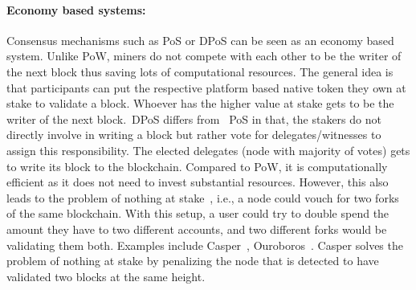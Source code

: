 \paragraph{Economy based systems:}Consensus mechanisms such as \ac{PoS} or
\ac{DPoS} can be seen as an economy based system. Unlike \ac{PoW}, miners do
not compete with each other to be the writer of the next block thus saving lots
of computational resources. The general idea is that participants can put the
respective platform based native token they own at stake to validate a block.
Whoever has the higher value at stake gets to be the writer of the next
block.~\ac{DPoS} differs from ~\ac{PoS} in that, the stakers do not directly
involve in writing a block but rather vote for delegates/witnesses to assign
this responsibility. The elected delegates (node with majority of votes) gets
to write its block to the blockchain. Compared to PoW, it is computationally
efficient as it does not need to invest substantial resources. However, this
also leads to the problem of nothing at stake~\cite{houy2014will}, i.e., a node
could vouch for two forks of the same blockchain. With this setup, a user could
try to double spend the amount they have to two different accounts, and two
different forks would be validating them both. Examples include
Casper~\cite{buterin2017casper}, Ouroboros~\cite{kiayias2017ouroboros}. Casper
solves the problem of nothing at stake by penalizing the node that is detected
to have validated two blocks at the same height.  
